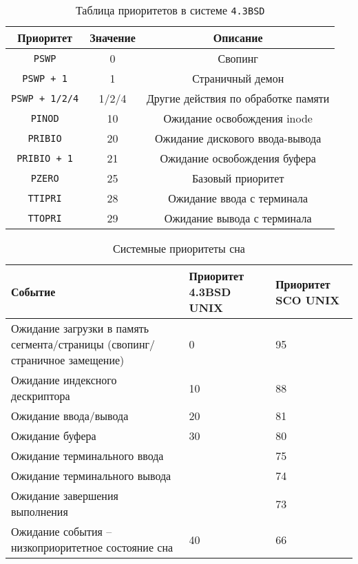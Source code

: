 \begin{table}[h]
    \caption{Таблица приоритетов в системе \texttt{4.3BSD}}
    \label{tab:bsd}
    \begin{center}
        \begin{tabular}{ |c|c|c| }
            \hline
            \textbf{Приоритет} & \textbf{Значение} & \textbf{Описание} \\
            \hline
            \texttt{PSWP} & 0 & Свопинг \\
            \hline
            \texttt{PSWP + 1} & 1 & Страничный демон \\
            \hline
            \texttt{PSWP + 1/2/4} & 1/2/4 & Другие действия по обработке памяти \\
            \hline
            \texttt{PINOD} & 10 & Ожидание освобождения inode \\
            \hline
            \texttt{PRIBIO} & 20 & Ожидание дискового ввода-вывода \\
            \hline
            \texttt{PRIBIO + 1} & 21 & Ожидание освобождения буфера \\
            \hline
            \texttt{PZERO} & 25 & Базовый приоритет \\
            \hline
            \texttt{TTIPRI} & 28 & Ожидание ввода с терминала \\
            \hline
            \texttt{TTOPRI} & 29 & Ожидание вывода с терминала \\
            \hline
        \end{tabular}
    \end{center}
\end{table}
\begin{table}[h]
    \caption{Системные приоритеты сна}
    \label{tab:ryb}
    \begin{center}
        \begin{tabular}{ |p{80mm}|p{40mm}|p{30mm}| }
            \hline
            \textbf{Событие} & \textbf{Приоритет 4.3BSD UNIX} & \textbf{Приоритет SCO UNIX} \\
            \hline
            Ожидание загрузки в память сегмента/страницы (свопинг/страничное замещение) & 0 & 95\\
            \hline
            Ожидание индексного дескриптора & 10 & 88\\
            \hline
            Ожидание ввода/вывода & 20 & 81\\
            \hline
            Ожидание буфера & 30 & 80\\
            \hline
            Ожидание терминального ввода & & 75\\
            \hline
            Ожидание терминального вывода &  & 74\\
            \hline
            Ожидание завершения выполнения & & 73\\
            \hline
            Ожидание события -- низкоприоритетное состояние сна & 40 & 66 \\
            \hline
        \end{tabular}
    \end{center}
\end{table}

